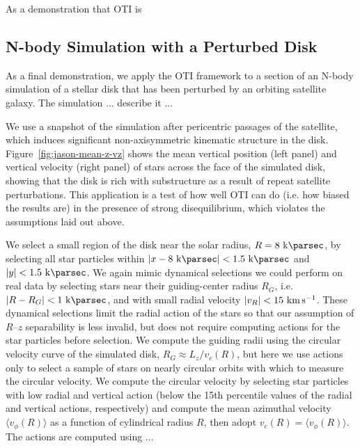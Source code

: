 As a demonstration that OTI is


\subsection{N-body Simulation with a Perturbed Disk}
\label{sec:sim-jason}

As a final demonstration, we apply the OTI framework to a section of an N-body
simulation of a stellar disk that has been perturbed by an orbiting satellite galaxy.
The simulation ... describe it ...

We use a snapshot of the simulation after  pericentric passages of the
satellite, which induces significant non-axisymmetric kinematic structure in the disk.
Figure~\ref{fig:jason-mean-z-vz} shows the mean vertical position (left panel) and
vertical velocity (right panel) of stars across the face of the simulated disk, showing
that the disk is rich with substructure as a result of repeat satellite perturbations.
This application is a test of how well OTI can do (i.e. how biased the results are) in
the presence of strong disequilibrium, which violates the assumptions laid out above.

We select a small region of the disk near the solar radius, $R=8~\kpc$, by selecting all
star particles within $|x-8~\kpc| < 1.5~\kpc$ and $|y| < 1.5~\kpc$.
We again mimic dynamical selections we could perform on real data by selecting stars
near their guiding-center radius $R_G$, i.e. $|R-R_G| < 1~\kpc$, and with small radial
velocity $|v_R| < 15~\kms$.
These dynamical selections limit the radial action of the stars so that our assumption
of $R$--$z$ separability is less invalid, but does not require computing actions for the
star particles before selection.
We compute the guiding radii using the circular velocity curve of the simulated disk,
$R_G \approx L_z / v_c(R)$, but here we use actions only to select a sample of stars on
nearly circular orbits with which to measure the circular velocity.
We compute the circular velocity by selecting star particles with low radial and
vertical action (below the 15th percentile values of the radial and vertical actions,
respectively) and compute the mean azimuthal velocity $\langle v_\phi(R) \rangle$ as a
function of cylindrical radius $R$, then adopt $v_c(R) = \langle v_\phi(R) \rangle$.
The actions are computed using ...


